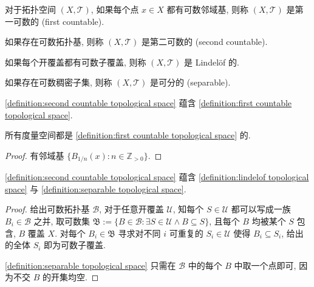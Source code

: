 \begin{definition}[可数性]
    \label {definition:first countable topological space}
    对于拓扑空间 \((X,\mathcal{T})\), 如果每个点 \(x \in X\) 都有可数邻域基, 则称 \((X,\mathcal{T})\) 是第一可数的 (first countable).

    \label {definition:second countable topological space}
    如果存在可数拓扑基, 则称 \((X,\mathcal{T})\) 是第二可数的 (second countable).
    
    \label {definition:lindelof topological space}
    如果每个开覆盖都有可数子覆盖, 则称 \((X,\mathcal{T})\) 是 Lindelöf 的.

    \label {definition:separable topological space}
    如果存在可数稠密子集, 则称 \((X,\mathcal{T})\) 是可分的 (separable).
\end{definition}

\begin{corollary}
    \ref{definition:second countable topological space} 蕴含 \ref{definition:first countable topological space}.
\end{corollary}

\begin{lemma}
    所有度量空间都是 \ref{definition:first countable topological space} 的.

    \begin{proof}
        有邻域基 \(\{B_{1/n} (x) : n \in \mathbb{Z}_{> 0}\}\).
    \end{proof}
\end{lemma}

\begin{lemma}
    \ref{definition:second countable topological space} 蕴含 \ref{definition:lindelof topological space} 与 \ref{definition:separable topological space}.

    \begin{proof}
        给出可数拓扑基 \(\mathcal{B}\), 对于任意开覆盖 \(\mathcal{U}\), 知每个 \(S \in \mathcal{U}\)
        都可以写成一族 \(B_i \in \mathcal{B}\) 之并, 取可数集 \(\mathfrak{B} := \{B \in \mathcal{B} : \exists S \in \mathcal{U} \land B \subseteq S\}\),
        且每个 \(B\) 均被某个 \(S\) 包含, \(B\) 覆盖 \(X\). 对每个 \(B_i \in \mathfrak{B}\) 寻求对不同 \(i\) 可重复的 \(S_i \in \mathcal{U}\) 使得 \(B_i \subseteq S_i\),
        给出的全体 \(S_i\) 即为可数子覆盖.

        \ref{definition:separable topological space} 只需在 \(\mathcal{B}\) 中的每个 \(B\) 中取一个点即可, 因为不交 \(B\) 的开集均空.
    \end{proof}
\end{lemma}

